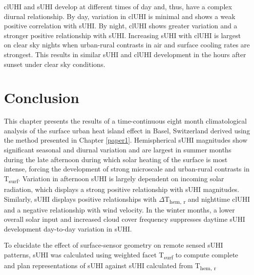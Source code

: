 clUHI and sUHI develop at different times of day and, thus, have a complex diurnal relationship. By day, variation in clUHI is minimal and shows a weak positive correlation with sUHI. By night, clUHI shows greater variation and a stronger positive relationship with sUHI. Increasing sUHI with clUHI is largest on clear sky nights when urban-rural contrasts in air and surface cooling rates are strongest. This results in similar sUHI and clUHI development in the hours after sunset under clear sky conditions. 

\section{Conclusion}

This chapter presents the results of a time-continuous eight month climatological analysis of the surface urban heat island effect in Basel, Switzerland derived using the method presented in Chapter \ref{paper1}. Hemispherical sUHI magnitudes show significant seasonal and diurnal variation and are largest in summer months during the late afternoon during which solar heating of the surface is most intense, forcing the development of strong microscale and urban-rural contrasts in T\textsubscript{surf}. Variation in afternoon sUHI is largely dependent on incoming solar radiation, which displays a strong positive relationship with sUHI magnitudes. Similarly, sUHI displays positive relationships with $\Delta$T\textsubscript{hem, r} and nighttime clUHI and a negative relationship with wind velocity. In the winter months, a lower overall solar input and increased cloud cover frequency suppresses daytime sUHI development day-to-day variation in sUHI.

 To elucidate the effect of surface-sensor geometry on remote sensed sUHI patterns, sUHI was calculated using weighted facet T\textsubscript{surf} to compute complete and plan representations of sUHI against sUHI calculated from T\textsubscript{hem, r}
